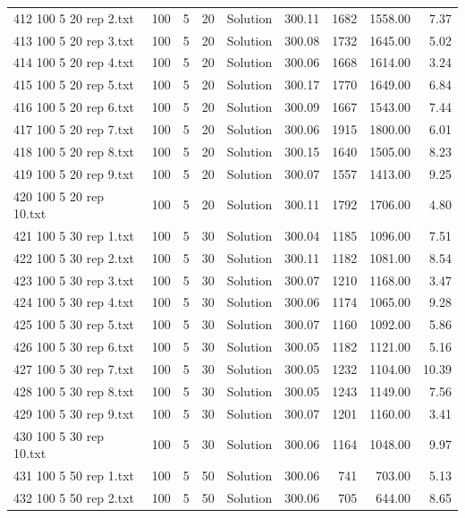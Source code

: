 \begin{longtable}{lrrllrrrr}
412 100 5 20 rep 2.txt & 100 & 5 & 20 & Solution & 300.11 & 1682 & 1558.00 &  7.37\\
413 100 5 20 rep 3.txt & 100 & 5 & 20 & Solution & 300.08 & 1732 & 1645.00 &  5.02\\
414 100 5 20 rep 4.txt & 100 & 5 & 20 & Solution & 300.06 & 1668 & 1614.00 &  3.24\\
415 100 5 20 rep 5.txt & 100 & 5 & 20 & Solution & 300.17 & 1770 & 1649.00 &  6.84\\
416 100 5 20 rep 6.txt & 100 & 5 & 20 & Solution & 300.09 & 1667 & 1543.00 &  7.44\\
417 100 5 20 rep 7.txt & 100 & 5 & 20 & Solution & 300.06 & 1915 & 1800.00 &  6.01\\
418 100 5 20 rep 8.txt & 100 & 5 & 20 & Solution & 300.15 & 1640 & 1505.00 &  8.23\\
419 100 5 20 rep 9.txt & 100 & 5 & 20 & Solution & 300.07 & 1557 & 1413.00 &  9.25\\
420 100 5 20 rep 10.txt & 100 & 5 & 20 & Solution & 300.11 & 1792 & 1706.00 &  4.80\\
421 100 5 30 rep 1.txt & 100 & 5 & 30 & Solution & 300.04 & 1185 & 1096.00 &  7.51\\
422 100 5 30 rep 2.txt & 100 & 5 & 30 & Solution & 300.11 & 1182 & 1081.00 &  8.54\\
423 100 5 30 rep 3.txt & 100 & 5 & 30 & Solution & 300.07 & 1210 & 1168.00 &  3.47\\
424 100 5 30 rep 4.txt & 100 & 5 & 30 & Solution & 300.06 & 1174 & 1065.00 &  9.28\\
425 100 5 30 rep 5.txt & 100 & 5 & 30 & Solution & 300.07 & 1160 & 1092.00 &  5.86\\
426 100 5 30 rep 6.txt & 100 & 5 & 30 & Solution & 300.05 & 1182 & 1121.00 &  5.16\\
427 100 5 30 rep 7.txt & 100 & 5 & 30 & Solution & 300.05 & 1232 & 1104.00 & 10.39\\
428 100 5 30 rep 8.txt & 100 & 5 & 30 & Solution & 300.05 & 1243 & 1149.00 &  7.56\\
429 100 5 30 rep 9.txt & 100 & 5 & 30 & Solution & 300.07 & 1201 & 1160.00 &  3.41\\
430 100 5 30 rep 10.txt & 100 & 5 & 30 & Solution & 300.06 & 1164 & 1048.00 &  9.97\\
431 100 5 50 rep 1.txt & 100 & 5 & 50 & Solution & 300.06 & 741 & 703.00 &  5.13\\
432 100 5 50 rep 2.txt & 100 & 5 & 50 & Solution & 300.06 & 705 & 644.00 &  8.65\\

\end{longtable}
